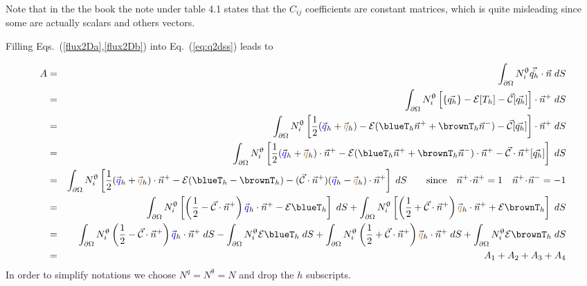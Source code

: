 \begin{itemize}
\begin{remark}
Note that in the the book the note under table 4.1 states that the $C_{ij}$ 
coefficients are constant matrices, which is quite misleading since some are actually scalars and others vectors.
\end{remark}

\end{itemize}


Filling Eqs.~(\ref{flux2Da},\ref{flux2Db}) into Eq.~(\ref{eq:q2dss}) leads to


\begin{eqnarray}
A&=& \int_{\partial\Omega} N^\uptheta_i \vec{\hat{q_h}} \cdot \vec{n} \; dS \nn\\ 
&=&
\int_{\partial\Omega} N^\uptheta_i \left[ \{ \vec{q_h} \} -{\cal{E}} [T_h]- \vec{\cal{C}}  [\vec{q_h}] \right] \cdot \vec{n}^+ \; dS  \nn\\
&=&
\int_{\partial\Omega}{N^\uptheta_i} \left[ \frac{1}{2}(\vec{\color{blue}q}_h + \vec{\color{brown}q}_h) 
-{\cal{E}} (\blueT_h \vec{n}^+ + \brownT_h \vec{n}^-)- \vec{\cal{C}}  [\vec{q_h}] \right] \cdot \vec{n}^+ \; dS  \nn\\
&=&
\int_{\partial\Omega}{N^\uptheta_i} \left[ \frac{1}{2}(\vec{\color{blue}q}_h + \vec{\color{brown}q}_h)\cdot\vec{n}^+ 
  -{\cal{E}} (\blueT_h \vec{n}^+ + \brownT_h \vec{n}^-) \cdot \vec{n}^+
- \vec{\cal{C}} \cdot \vec{n}^+ [\vec{q_h}] \right] \; dS  \nn\\
&=&
\int_{\partial\Omega}{N^\uptheta_i} \left[ \frac{1}{2}(\vec{\color{blue}q}_h + \vec{\color{brown}q}_h)\cdot\vec{n}^+  -{\cal{E}} (\blueT_h -\brownT_h ) 
- (\vec{\cal{C}} \cdot \vec{n}^+) 
(\vec{\color{blue}q}_h - \vec{\color{brown}q}_h) \cdot \vec{n}^+
\right] \; dS  \qquad \text{since} \quad  \vec{n}^+\!\cdot\!\vec{n}^+ =1 \quad  \vec{n}^+\!\cdot\!\vec{n}^- =-1 \nn\\
&=&
\int_{\partial\Omega}{N^\uptheta_i} \left[
\left(\frac{1}{2} - \vec{\cal{C}} \cdot \vec{n}^+ \right) \vec{\color{blue}q}_h\cdot\vec{n}^+
- {\cal{E}} \blueT_h
\right] \; dS 
+ 
\int_{\partial\Omega}{N^\uptheta_i} \left[
\left(\frac{1}{2} + \vec{\cal{C}} \cdot \vec{n}^+ \right)
\vec{\color{brown}q}_h \cdot\vec{n}^+
+ {\cal{E}} \brownT_h
\right] \; dS  \nn \\
&=&
\int_{\partial\Omega}{N^\uptheta_i} 
\left(\frac{1}{2} - \vec{\cal{C}} \cdot \vec{n}^+ \right) \vec{\color{blue}q}_h\cdot\vec{n}^+ \; dS 
- \int_{\partial\Omega}{N^\uptheta_i}  {\cal{E}} \blueT_h  \; dS 
+ 
\int_{\partial\Omega}{N^\uptheta_i} \left(\frac{1}{2} + \vec{\cal{C}} \cdot \vec{n}^+ \right)
\vec{\color{brown}q}_h \cdot\vec{n}^+   \; dS
+
\int_{\partial\Omega}{N^\uptheta_i}   {\cal{E}} \brownT_h   \; dS  \nn \\
&=& A_1 + A_2 + A_3 + A_4 
\end{eqnarray}
In order to simplify notations we choose $N^q=N^\uptheta=N$ and drop the $h$ subscripts.

